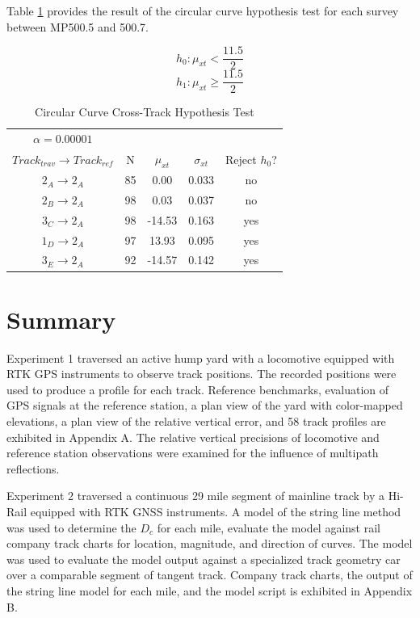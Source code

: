 Table \ref{tab:crvHypo} provides the result of the circular curve hypothesis test for each survey between MP500.5 and 500.7.

\begin{equation}
	h_{0}: \mu_{xt} < \frac{11.5}{2}
\end{equation}
\begin{equation}
	h_{1}: \mu_{xt} \ge \frac{11.5}{2}
\end{equation}

\begin{table}[!h]
	\begin{center}
	\caption{Circular Curve Cross-Track Hypothesis Test}
	\label{tab:crvHypo}
		\begin{tabular}{c c  c c c }
\toprule
{$\alpha = 0.00001$} & &   &\\
	$Track_{trav}\rightarrow Track_{ref}$ & N  & ${\mu_{xt}}$ & ${\sigma_{xt}}$ & Reject ${h_0}$?  \\
\midrule
	 $2_A\rightarrow2_A$ & 85   &  0.00 & 0.033  & no \\
	 $2_B\rightarrow2_A$ & 98   &   0.03  & 0.037  & no \\
	 $3_C\rightarrow2_A$ & 98   &  -14.53    & 0.163  & yes \\
	 $1_D\rightarrow2_A$ & 97   &   13.93      & 0.095  & yes \\
	 $3_E\rightarrow2_A$ & 92   &   -14.57     & 0.142  & yes \\
\bottomrule
	\end{tabular}
	\end{center}
\end{table}

\section{Summary}
Experiment 1 traversed an active hump yard with a locomotive equipped with RTK GPS instruments to observe track positions. The recorded positions were used to produce a profile for each track. Reference benchmarks, evaluation of GPS signals at the reference station, a plan view of the yard with color-mapped elevations, a plan view of the relative vertical error, and 58 track profiles are exhibited in Appendix A. The relative vertical precisions of locomotive and reference station observations were examined for the influence of multipath reflections. 

Experiment 2 traversed a continuous 29 mile segment of mainline track by a Hi-Rail equipped with RTK GNSS instruments. A model of the string line method was used to determine the ${D_c}$ for each mile, evaluate the model against rail company track charts for location, magnitude, and direction of curves. The model was used to evaluate the model output against a specialized track geometry car over a comparable segment of tangent track. Company track charts, the output of the string line model for each mile, and the model script is exhibited in Appendix B.

